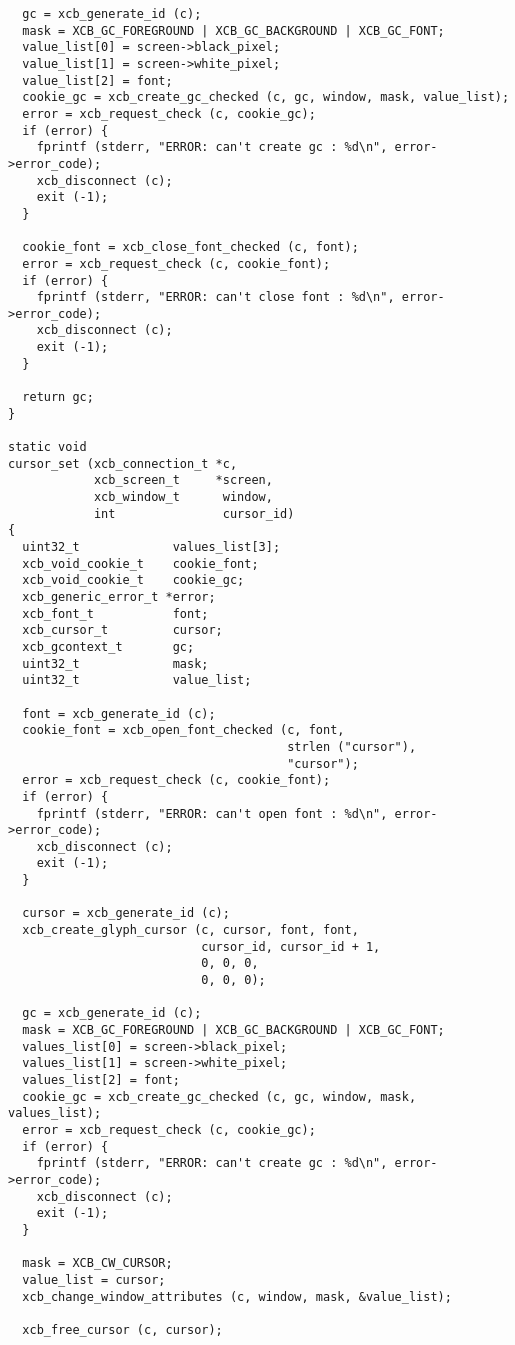 \documentclass[12pt,oneside,titlepage]{book}
\begin{document}
\begin{enumerate}
\begin{enumerate}
\begin{verbatim}
  gc = xcb_generate_id (c);
  mask = XCB_GC_FOREGROUND | XCB_GC_BACKGROUND | XCB_GC_FONT;
  value_list[0] = screen->black_pixel;
  value_list[1] = screen->white_pixel;
  value_list[2] = font;
  cookie_gc = xcb_create_gc_checked (c, gc, window, mask, value_list);
  error = xcb_request_check (c, cookie_gc);
  if (error) {
    fprintf (stderr, "ERROR: can't create gc : %d\n", error->error_code);
    xcb_disconnect (c);
    exit (-1);
  }

  cookie_font = xcb_close_font_checked (c, font);
  error = xcb_request_check (c, cookie_font);
  if (error) {
    fprintf (stderr, "ERROR: can't close font : %d\n", error->error_code);
    xcb_disconnect (c);
    exit (-1);
  }

  return gc;
}

static void
cursor_set (xcb_connection_t *c,
            xcb_screen_t     *screen,
            xcb_window_t      window,
            int               cursor_id)
{
  uint32_t             values_list[3];
  xcb_void_cookie_t    cookie_font;
  xcb_void_cookie_t    cookie_gc;
  xcb_generic_error_t *error;
  xcb_font_t           font;
  xcb_cursor_t         cursor;
  xcb_gcontext_t       gc;
  uint32_t             mask;
  uint32_t             value_list;

  font = xcb_generate_id (c);
  cookie_font = xcb_open_font_checked (c, font,
                                       strlen ("cursor"),
                                       "cursor");
  error = xcb_request_check (c, cookie_font);
  if (error) {
    fprintf (stderr, "ERROR: can't open font : %d\n", error->error_code);
    xcb_disconnect (c);
    exit (-1);
  }

  cursor = xcb_generate_id (c);
  xcb_create_glyph_cursor (c, cursor, font, font,
                           cursor_id, cursor_id + 1,
                           0, 0, 0,
                           0, 0, 0);

  gc = xcb_generate_id (c);
  mask = XCB_GC_FOREGROUND | XCB_GC_BACKGROUND | XCB_GC_FONT;
  values_list[0] = screen->black_pixel;
  values_list[1] = screen->white_pixel;
  values_list[2] = font;
  cookie_gc = xcb_create_gc_checked (c, gc, window, mask, values_list);
  error = xcb_request_check (c, cookie_gc);
  if (error) {
    fprintf (stderr, "ERROR: can't create gc : %d\n", error->error_code);
    xcb_disconnect (c);
    exit (-1);
  }

  mask = XCB_CW_CURSOR;
  value_list = cursor;
  xcb_change_window_attributes (c, window, mask, &value_list);

  xcb_free_cursor (c, cursor);


\end{verbatim}
\end{enumerate}
\end{enumerate}
\end{document}
